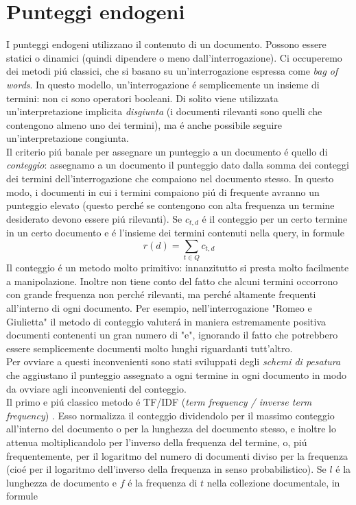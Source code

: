 \section{Punteggi endogeni}
I punteggi endogeni utilizzano il contenuto di un documento. Possono essere statici o dinamici (quindi dipendere o meno dall'interrogazione). Ci occuperemo dei metodi piú classici, che si basano su un'interrogazione espressa come \textit{bag of words}. In questo modello, un'interrogazione é semplicemente un insieme di termini: non ci sono operatori booleani. Di solito viene utilizzata un'interpretazione implicita \textit{disgiunta} (i documenti rilevanti sono quelli che contengono almeno uno dei termini), ma é anche possibile seguire un'interpretazione congiunta.\\
Il criterio piú banale per assegnare un punteggio a un documento é quello di \textit{conteggio}: assegnamo a un documento il punteggio dato dalla somma dei conteggi dei termini dell'interrogazione che compaiono nel documento stesso. In questo modo, i documenti in cui i termini compaiono piú di frequente avranno un punteggio elevato (questo perché se contengono con alta frequenza un termine desiderato devono essere piú rilevanti). Se $c_{t, d}$ é il conteggio per un certo termine in un certo documento e  é l'insieme dei termini contenuti nella query, in formule
\begin{equation*}
    r(d) = \sum_{t \in Q}{c_{t, d}}
\end{equation*}
Il conteggio é un metodo molto primitivo: innanzitutto si presta molto facilmente a manipolazione. Inoltre non tiene conto del fatto che alcuni termini occorrono con grande frequenza non perché rilevanti, ma perché altamente frequenti all'interno di ogni documento. Per esempio, nell'interrogazione "Romeo e Giulietta" il metodo di conteggio valuterá in maniera estremamente positiva documenti contenenti un gran numero di "e", ignorando il fatto che potrebbero essere semplicemente documenti molto lunghi riguardanti tutt'altro.\\
Per ovviare a questi inconvenienti sono stati sviluppati degli \textit{schemi di pesatura} che aggiustano il punteggio assegnato a ogni termine in ogni documento in modo da ovviare agli inconvenienti del conteggio.\\
Il primo e piú classico metodo é TF/IDF (\textit{term frequency / inverse term frequency}) %
. Esso normalizza il conteggio dividendolo per il massimo conteggio all'interno del documento o per la lunghezza del documento stesso, e inoltre lo attenua moltiplicandolo per l'inverso della frequenza del termine, o, piú frequentemente, per il logaritmo del numero di documenti diviso per la frequenza (cioé per il logaritmo dell'inverso della frequenza in senso probabilistico). Se $l$ é la lunghezza de documento e $f$ é la frequenza di $t$ nella collezione documentale, in formule
